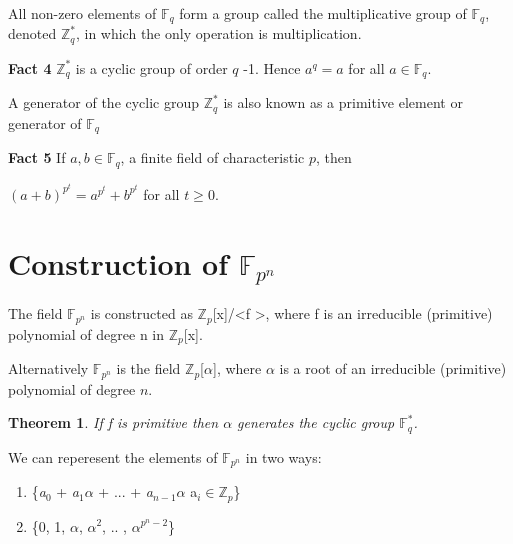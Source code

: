 \documentclass[iwp,first]{luthesis}
\begin{document}
\begin{mydef}
All non-zero elements of $\mathbb{F}_q$  form a group called the multiplicative group of $\mathbb{F}_q$, denoted $\mathbb{Z}_{q}^{*}$, in which the only operation is multiplication.
\end{mydef}

\textbf{Fact 4} $\mathbb{Z}_{q}^{*}$ is a cyclic group of order $q$ -1. Hence $a^q = a$ for all $a\in \mathbb{F}_q$.

\begin{mydef}
A generator of the cyclic group $\mathbb{Z}_{q}^{*}$ is also known as a primitive element or generator of $\mathbb{F}_{q}$
\end{mydef}

\textbf{Fact 5} If $a, b\in \mathbb{F}_q$, a finite field of characteristic $p$, then

\begin{center}

$(a + b)^{p^t} = a^{p^t} + b^{p^t}$ for all $t \geq 0$.

\end{center}

\section{Construction of $\mathbb{F}_{p^n}$}

\begin{mydef}
The field $\mathbb{F}_{p^n}$ is constructed as $\mathbb{Z}_p$[x]/\textless f \textgreater, where f is an irreducible (primitive) polynomial of degree n in $\mathbb{Z}_p$[x].
\end{mydef}

Alternatively $\mathbb{F}_{p^n}$ is the field $\mathbb{Z}_p$[$\alpha$], where $\alpha$ is a root of an irreducible (primitive) polynomial of degree $n$.

\newtheorem{theorem}{Theorem}
\begin{theorem}
If f is primitive then $\alpha$ generates the cyclic group $\mathbb{F}_{q}^{*}$.
\end{theorem}

We can reperesent the elements of $\mathbb{F}_{p^n}$ in two ways:

\begin{enumerate}

\item \{\textit{a}$_0$ + \textit{a}$_{1}\alpha$ + ... + \textit{a}$_{n-1}\alpha$ \textbar a$_i\in \mathbb{Z}_p$\}

\item \{0, 1, $\alpha$, $\alpha^2$, .. , $\alpha^{{p^n}-2}$\}

\end{enumerate}
\end{document}
